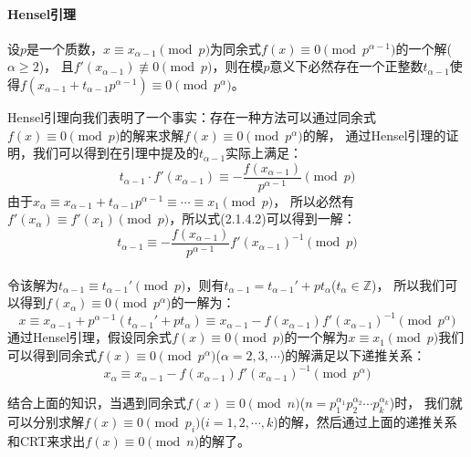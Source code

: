 \documentclass{article}
\numberwithin{equation}{subsubsection}
\begin{document}
\paragraph{\textbf{Hensel引理}}
设$p$是一个质数，$x\equiv x_{\alpha-1}\pmod{p}$为同余式$f(x)\equiv 0\pmod{p^{\alpha-1}}$的一个解($\alpha\ge 2$)，
且$f'(x_{\alpha-1})\not\equiv 0\pmod{p}$，则在模$p$意义下必然存在一个正整数$t_{\alpha-1}$使得$f(x_{\alpha-1}+t_{\alpha-1}p^{\alpha-1})\equiv 0\pmod{p^\alpha}$。\par
Hensel引理向我们表明了一个事实：存在一种方法可以通过同余式$f(x)\equiv 0\pmod{p}$的解来求解$f(x)\equiv 0\pmod{p^\alpha}$的解，
通过Hensel引理的证明，我们可以得到在引理中提及的$t_{\alpha-1}$实际上满足：
\begin{equation}
    t_{\alpha-1}\cdot f'(x_{\alpha-1})\equiv -\frac{f(x_{\alpha-1})}{p^{\alpha-1}}\pmod{p}
\end{equation}
由于$x_{\alpha}\equiv x_{\alpha-1} + t_{\alpha-1}p^{\alpha-1}\equiv\cdots\equiv x_1\pmod{p}$，
所以必然有$f'(x_{\alpha})\equiv f'(x_1)\pmod{p}$，所以式(2.1.4.2)可以得到一解：
\begin{equation}
    t_{\alpha-1}\equiv -\frac{f(x_{\alpha-1})}{p^{\alpha-1}}f'(x_{\alpha-1})^{-1}\pmod{p}
    \nonumber
\end{equation}\\
令该解为$t_{\alpha-1}\equiv t_{\alpha-1}' \pmod{p}$，则有$t_{\alpha-1}=t_{\alpha-1}'+pt_{\alpha}$($t_{\alpha}\in\mathbb{Z}$)，
所以我们可以得到$f(x_{\alpha})\equiv 0\pmod{p^\alpha}$的一解为：
\begin{equation}
    x\equiv x_{\alpha-1}+p^{\alpha-1}(t_{\alpha-1}'+pt_{\alpha})\equiv x_{\alpha-1}-f(x_{\alpha-1})f'(x_{\alpha-1})^{-1}\pmod{p^\alpha}
    \nonumber
\end{equation}
通过Hensel引理，假设同余式$f(x)\equiv 0\pmod{p}$的一个解为$x\equiv x_1\pmod{p}$我们可以得到同余式$f(x)\equiv 0\pmod{p^\alpha}$($\alpha=2,3,\cdots$)的解满足以下递推关系：
\begin{equation}
    x_{\alpha} \equiv x_{\alpha-1}-f(x_{\alpha-1})f'(x_{\alpha-1})^{-1}\pmod{p^\alpha}
    \nonumber
\end{equation}\par
结合上面的知识，当遇到同余式$f(x)\equiv 0\pmod{n}$($n=p_1^{\alpha_1}p_2^{\alpha_2}\cdots p_k^{\alpha_k}$)时，
我们就可以分别求解$f(x)\equiv 0\pmod{p_i}$($i=1,2,\cdots,k$)的解，然后通过上面的递推关系和CRT来求出$f(x)\equiv 0\pmod{n}$的解了。\par
\end{document}
